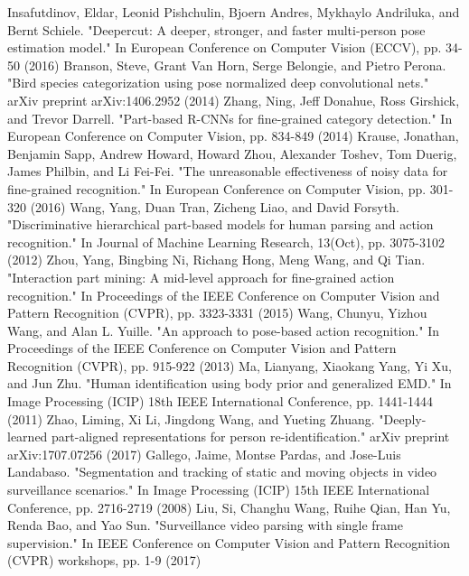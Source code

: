 \begin{thebibliography}{}
Insafutdinov, Eldar, Leonid Pishchulin, Bjoern Andres, Mykhaylo Andriluka, and Bernt Schiele. "Deepercut: A deeper, stronger, and faster multi-person pose estimation model." In European Conference on Computer Vision (ECCV), pp. 34-50 (2016)
%
Branson, Steve, Grant Van Horn, Serge Belongie, and Pietro Perona. "Bird species categorization using pose normalized deep convolutional nets." arXiv preprint arXiv:1406.2952 (2014)
Zhang, Ning, Jeff Donahue, Ross Girshick, and Trevor Darrell. "Part-based R-CNNs for fine-grained category detection." In European Conference on Computer Vision, pp. 834-849 (2014)
Krause, Jonathan, Benjamin Sapp, Andrew Howard, Howard Zhou, Alexander Toshev, Tom Duerig, James Philbin, and Li Fei-Fei. "The unreasonable effectiveness of noisy data for fine-grained recognition." In European Conference on Computer Vision, pp. 301-320 (2016)
%
Wang, Yang, Duan Tran, Zicheng Liao, and David Forsyth. "Discriminative hierarchical part-based models for human parsing and action recognition." In Journal of Machine Learning Research, 13(Oct), pp. 3075-3102 (2012)
Zhou, Yang, Bingbing Ni, Richang Hong, Meng Wang, and Qi Tian. "Interaction part mining: A mid-level approach for fine-grained action recognition." In Proceedings of the IEEE Conference on Computer Vision and Pattern Recognition (CVPR), pp. 3323-3331 (2015)
Wang, Chunyu, Yizhou Wang, and Alan L. Yuille. "An approach to pose-based action recognition." In Proceedings of the IEEE Conference on Computer Vision and Pattern Recognition (CVPR), pp. 915-922 (2013)
%
Ma, Lianyang, Xiaokang Yang, Yi Xu, and Jun Zhu. "Human identification using body prior and generalized EMD." In Image Processing (ICIP) 18th IEEE International Conference, pp. 1441-1444 (2011)
Zhao, Liming, Xi Li, Jingdong Wang, and Yueting Zhuang. "Deeply-learned part-aligned representations for person re-identification." arXiv preprint arXiv:1707.07256 (2017)
%
Gallego, Jaime, Montse Pardas, and Jose-Luis Landabaso. "Segmentation and tracking of static and moving objects in video surveillance scenarios." In Image Processing (ICIP) 15th IEEE International Conference, pp. 2716-2719 (2008)
Liu, Si, Changhu Wang, Ruihe Qian, Han Yu, Renda Bao, and Yao Sun. "Surveillance video parsing with single frame supervision." In IEEE Conference on Computer Vision and Pattern Recognition (CVPR) workshops, pp. 1-9 (2017)

\end{thebibliography}
